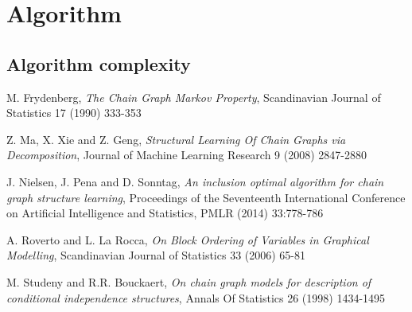 \documentclass{pracamgr}
\theoremstyle{definition}
\begin{document}
	\section{Algorithm} \label{sec:CKESAlg}
		
		
		\subsection{Algorithm complexity}

\begin{thebibliography}{99}
	 M. Frydenberg, \textit{The Chain Graph Markov Property}, Scandinavian Journal of Statistics 17 (1990) 333-353	
	
	 Z. Ma, X. Xie and Z. Geng, \textit{Structural Learning Of Chain Graphs via Decomposition}, Journal of Machine Learning Research 9 (2008) 2847-2880

	 J. Nielsen, J. Pena and D. Sonntag, \textit{An inclusion optimal algorithm for chain graph structure learning}, Proceedings of the Seventeenth International
		Conference on Artificial Intelligence and Statistics, PMLR (2014) 33:778-786

	 A. Roverto and L. La Rocca, \textit{On Block Ordering of Variables in Graphical Modelling}, Scandinavian Journal of Statistics 33 (2006) 65-81

	 M. Studeny and R.R. Bouckaert, \textit{On chain graph models for description of conditional independence structures}, Annals Of Statistics 26 (1998) 1434-1495
	
\end{thebibliography}
\end{document}

